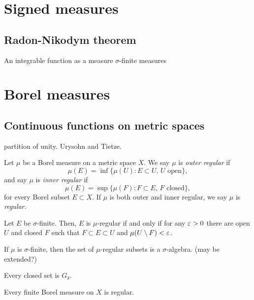 \documentclass{../../large}
\begin{document}
\chapter{Signed measures}




\section{Radon-Nikodym theorem}

An integrable function as a measure
$\sigma$-finite measures



\chapter{Borel measures}



\section{Continuous functions on metric spaces}

partition of unity.
Urysohn and Tietze.


\begin{prb}
Let $\mu$ be a Borel measure on a metric space $X$.
We say $\mu$ is \emph{outer regular} if
\[\mu(E)=\inf\{\mu(U):E\subset U,\,U\text{ open}\},\]
and say $\mu$ is \emph{inner regular} if
\[\mu(E)=\sup\{\mu(F):F\subset E,\,F\text{ closed}\},\]
for every Borel subset $E\subset X$.
If $\mu$ is both outer and inner regular, we say $\mu$ is \emph{regular}.
\begin{parts}
\item Let $E$ be $\sigma$-finite. Then, $E$ is $\mu$-regular if and only if for any $\varepsilon>0$ there are open $U$ and closed $F$ such that $F\subset E\subset U$ and $\mu(U\setminus F)<\varepsilon$.
\item If $\mu$ is $\sigma$-finite, then the set of $\mu$-regular subsets is a $\sigma$-algebra. (may be extended?)
\item Every closed set is $G_\delta$.
\item Every finite Borel measure on $X$ is regular.
\end{parts}
\end{prb}
\begin{pf}
\end{pf}
\end{document}
